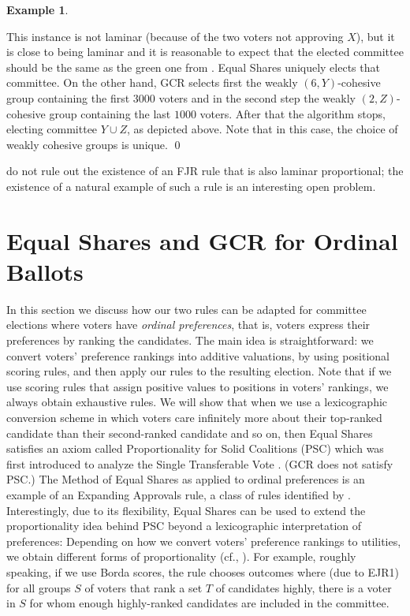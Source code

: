 \documentclass[10pt]{scrartcl}
\newcommand{\myemph}[1]{{\color{winered}\emph{#1}}}
\theoremstyle{definition}
\newtheorem{example}{Example}
\theoremstyle{plain}
\begin{document}
\begin{example}
\begin{center}
	\end{center}
	This instance is not laminar (because of the two voters not approving $X$), but it is close to being laminar and it is reasonable to expect that the elected committee should be the same as the green one from . Equal Shares uniquely elects that committee. On the other hand, GCR selects first the weakly $(6, Y)$-cohesive group containing the first $3000$ voters and in the second step the weakly $(2,Z)$-cohesive group containing the last $1000$ voters. After that the algorithm stops, electing committee $Y\cup Z$, as depicted above. Note that in this case, the choice of weakly cohesive groups is unique. \qed
\end{example}

 do not rule out the existence of an FJR rule that is also laminar proportional; the existence of a natural example of such a rule is an interesting open problem.

\section{Equal Shares and GCR for Ordinal Ballots}
\label{sec:ordinal_model}

In this section we discuss how our two rules can be adapted for committee elections where voters have \myemph{ordinal preferences}, that is, voters express their preferences by ranking the candidates. 
The main idea is straightforward: we convert voters' preference rankings into additive valuations, by using positional scoring rules, and then apply our rules to the resulting election. Note that if we use scoring rules that assign positive values to positions in voters' rankings, we always obtain exhaustive rules. We will show that when we use a lexicographic conversion scheme in which voters care infinitely more about their top-ranked candidate than their second-ranked candidate and so on, then Equal Shares satisfies an axiom called Proportionality for Solid Coalitions (PSC) which was first introduced to analyze the Single Transferable Vote \citep{woo:j:properties,tid-ric:j:stv}. (GCR does not satisfy PSC.) The Method of Equal Shares as applied to ordinal preferences is an example of an Expanding Approvals rule, a class of rules identified by \citet{az-bar:expanding_approval}.  Interestingly, due to its flexibility, Equal Shares can be used to extend the proportionality idea behind PSC beyond a lexicographic interpretation of preferences: Depending on how we convert voters' preference rankings to utilities, we obtain different forms of proportionality (cf., \citealp{fal-sko-szu-tal:stv_and_pav}). For example, roughly speaking, if we use Borda scores, the rule chooses outcomes where (due to EJR1) for all groups $S$ of voters that rank a set $T$ of candidates highly, there is a voter in $S$ for whom enough highly-ranked candidates are included in the committee.
\end{document}
